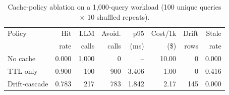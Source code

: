 \begin{table}[t]
\centering
\caption{Cache-policy ablation on a 1{,}000-query workload (100 unique queries $\times$ 10 shuffled repeats).}
\label{tab:cache-ablation}
\footnotesize
\begin{tabular}{lrrrrrrr}
\hline
Policy & Hit & LLM & Avoid. & p95 & Cost/1k & Drift & Stale \\
 & rate & calls & calls & (ms) & (\$) & rows & rate \\
\hline
No cache & 0.000 & 1,000 & 0 & -- & 10.00 & 0 & 0.000 \\
TTL-only & 0.900 & 100 & 900 & 3.406 & 1.00 & 0 & 0.416 \\
Drift-cascade & 0.783 & 217 & 783 & 1.842 & 2.17 & 145 & 0.000 \\
\hline
\end{tabular}
\end{table}
